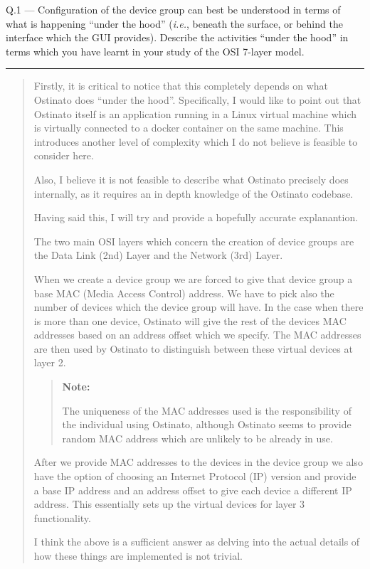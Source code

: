 \documentclass{article}
\newcommand\Que[2]{%
\begin{samepage}
\leavevmode\par
\noindent
Q.#1 --- #2\par\vspace{10pt}\hrule\vspace{10pt}
\end{samepage}}
\newenvironment{ans}
{\fbox{Answer}\begin{quote}\nopagebreak}
{\end{quote}}
\newcommand\ie{\emph{i.e.}}
\newenvironment{note}{%
\begin{quote}
\begin{tcolorbox}[colback=gray!10,arc=0mm,boxrule=0pt]
\raggedright
\textbf{Note:}%
}{%
\end{tcolorbox}
\end{quote}%
}
\begin{document}
\Que{1}{Configuration of the device group can best be understood
in terms of what is happening ``under the hood'' (\ie{},
beneath the surface, or behind the interface which the GUI
provides). Describe the activities ``under the hood'' in
terms which you have learnt in your study of the OSI 7-layer
model.}

\begin{ans}
Firstly, it is critical to notice that this completely depends
on what Ostinato does ``under the hood''. Specifically, I would
like to point out that Ostinato itself is an application running
in a Linux virtual machine which is virtually connected to a
docker container on the same machine. This introduces another
level of complexity which I do not believe is feasible to
consider here.

Also, I believe it is not feasible to describe what Ostinato
precisely does internally, as it requires an in depth knowledge
of the Ostinato codebase.

Having said this, I will try and provide a hopefully accurate
explanantion.

The two main OSI layers which concern the creation of
device groups are the Data Link (2nd) Layer and the Network
(3rd) Layer.

When we create a device group we are forced to give that
device group a base MAC (Media Access Control) address. We
have to pick also the number of devices which the device
group will have. In the case when there is more than one
device, Ostinato will give the rest of the devices MAC
addresses based on an address offset which we specify. The
MAC addresses are then used by Ostinato to distinguish
between these virtual devices at layer 2.

\begin{note}
The uniqueness of the MAC addresses used is the responsibility
of the individual using Ostinato, although Ostinato seems to
provide random MAC address which are unlikely to be already in
use.
\end{note}

After we provide MAC addresses to the devices in the device
group we also have the option of choosing an Internet
Protocol (IP) version and provide a base IP address and an
address offset to give each device a different IP address.
This essentially sets up the virtual devices for layer 3
functionality.

I think the above is a sufficient answer as delving into the
actual details of how these things are implemented is not
trivial.
\end{ans}
\end{document}
